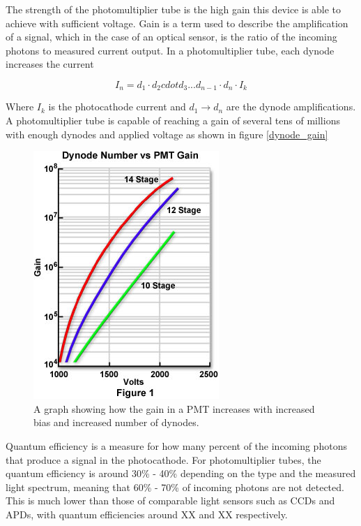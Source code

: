 The strength of the photomultiplier tube is the high gain this device is able to achieve with sufficient voltage. Gain is a term used to describe the amplification of a signal, which in the case of an optical sensor, is the ratio of the incoming photons to measured current output. In a photomultiplier tube, each dynode increases the current

\begin{equation}
    I_n = d_1 \cdot d_2 cdot d_3 ... d_{n-1} \cdot d_n \cdot I_k
\end{equation}

Where $I_k$ is the photocathode current and $d_1 \rightarrow d_n$ are the dynode amplifications. A photomultiplier  tube is capable of reaching a gain of several tens of millions with enough dynodes and applied voltage as shown in figure \ref{dynode_gain}\\

\begin{figure}[htb]
\begin{center}
\includegraphics[scale=0.6]{figures/RCS/dynodegain}
\caption{A graph showing how the gain in a PMT increases with increased bias and increased number of dynodes.}
\label{fig:dynode_gain}
\end{center}
\end{figure}

Quantum efficiency is a measure for how many percent of the incoming photons that produce a signal in the photocathode. For photomultiplier tubes, the quantum efficiency is around 30\% - 40\% depending on the type and the measured light spectrum, meaning that 60\% - 70\% of incoming photons are not detected. This is much lower than those of comparable light sensors such as CCDs and APDs, with quantum efficiencies around XX and XX respectively.\\


